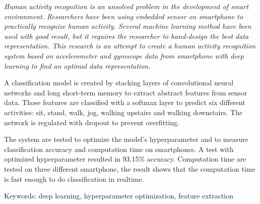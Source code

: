 \begin{abstracteng}
    \itshape
    Human activity recognition is an unsolved problem in the development of smart environment. Researchers have been using embedded sensor on smartphone to practically recognize human activity. Several machine learning method have been used with good result, but it requires the researcher to hand-design the best data representation. This research is an attempt to create a human activity recognition system based on accelerometer and gyroscope data from smartphone with deep learning to find an optimal data representation.

    A classification model is created by stacking layers of convolutional neural networks and long short-term memory to extract abstract features from sensor data. Those features are classified with a softmax layer to predict six different activities: sit, stand, walk, jog, walking upstairs and walking downstairs. The network is regulated with dropout to prevent overfitting.

    The system are tested to optimize the model's hyperparameter and to measure classification accuracy and computation time on smartphones. A test with optimized hyperparameter resulted in 93.15\% accuracy. Computation time are tested on three different smartphone, the result shows that the computation time is fast enough to do classification in realtime.

    \bigskip
    Keywords: deep learning, hyperparameter optimization, feature extraction
\end{abstracteng}
